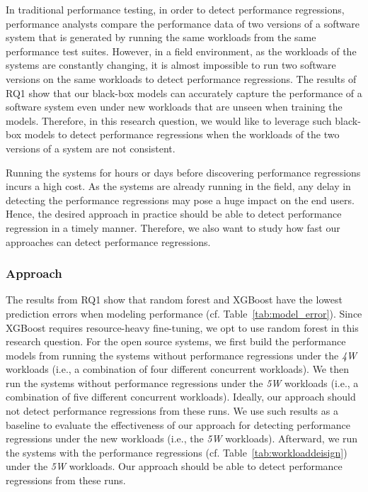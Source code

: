 In traditional performance testing, in order to detect performance regressions, performance analysts compare the performance data of two versions of a software system that is generated by running the same workloads from the same performance test suites. 
However, in a field environment, as the workloads of the systems are constantly changing, it is almost impossible to run two software versions on the same workloads to detect performance regressions.
The results of RQ1 show that our black-box models can accurately capture the performance of a software system even under new workloads that are unseen when training the models.
Therefore, in this research question, we would like to leverage such black-box models to detect performance regressions when the workloads of the two versions of a system are not consistent.

Running the systems for hours or days before discovering performance regressions incurs a high cost. As the systems are already running in the field, any delay in detecting the performance regressions may pose a huge impact on the end users. Hence, the desired approach in practice should be able to detect performance regression in a timely manner. Therefore, we also want to study how fast our approaches can detect performance regressions. 

\subsubsection*{Approach}

The results from RQ1 show that random forest and XGBoost have the lowest prediction errors when modeling performance (cf. Table~\ref{tab:model_error}). Since XGBoost requires resource-heavy fine-tuning, we opt to use random forest in this research question. For the open source systems, we first build the performance models from running the systems without performance regressions under the \emph{4W} workloads (i.e., a combination of four different concurrent workloads). We then run the systems without performance regressions under the \emph{5W} workloads (i.e., a combination of five different concurrent workloads). Ideally, our approach should not detect performance regressions from these runs. 
We use such results as a baseline to evaluate the effectiveness of our approach for detecting performance regressions under the new workloads (i.e., the \emph{5W} workloads). 
Afterward, we run the systems with the performance regressions (cf. Table~\ref{tab:workloaddeisign}) under the \emph{5W} workloads. Our approach should be able to detect performance regressions from these runs.


